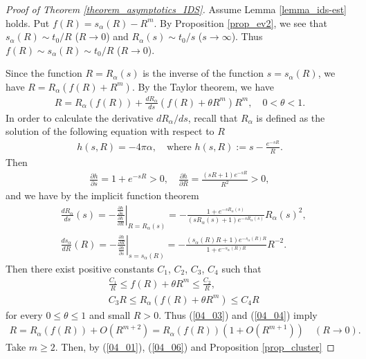 \documentclass[12pt,a4paper]{article}
\begin{document}
\begin{proof}[Proof of Theorem \ref{theorem_asymptotics_IDS}]
Assume Lemma \ref{lemma_ids-est} holds.
Put $f(R)=s_\alpha(R)-R^m$.
By Proposition \ref{prop_ev2},
we see that $s_\alpha(R)\sim t_0/R$ ($R\to 0$) and
$R_\alpha(s)\sim t_0/s$ ($s\to \infty$).
Thus $f(R)\sim s_\alpha(R)\sim t_0/R$ ($R\to 0$).


Since 
the function $R=R_\alpha(s)$ is the inverse of 
the function $s=s_\alpha(R)$, we have
$R=R_\alpha(f(R)+R^m)$.
By the Taylor theorem, we have
\begin{align}
R=
R_\alpha(f(R))+\frac{d R_\alpha}{d s}(f(R)+\theta R^m)R^m,\quad 0<\theta<1.
\label{04_03}
\end{align}
In order to calculate the derivative $dR_\alpha/ds$,
recall that $R_\alpha$ is defined as the solution of the 
following equation with respect to $R$
\begin{align*}
 h(s,R)=-4\pi\alpha,\quad
\mbox{where }
h(s,R):=s- \frac{e^{-sR}}{R}.
\end{align*}
Then
\begin{align*}
 \frac{\partial h}{\partial s}=
1+e^{-sR}>0,\quad
 \frac{\partial h}{\partial R}=
\frac{(sR+1)e^{-sR}}{R^2}>0,
\end{align*}
and we have by the implicit function theorem
\begin{align}
&\frac{dR_\alpha}{ds}(s)
=-
\left.
\frac{\frac{\partial h}{\partial s}}{\frac{\partial h}{\partial R}}
\right|_{R=R_\alpha(s)}
=
-\frac{ 1+e^{-sR_\alpha(s)}}{(sR_\alpha(s)+1)e^{-sR_\alpha(s)}}R_\alpha(s)^2,
\label{04_04}\\
&\frac{ds_\alpha}{dR}(R)
=-
\left.
\frac{\frac{\partial h}{\partial R}}{\frac{\partial h}{\partial s}}
\right|_{s=s_\alpha(R)}
=
-
\frac{(s_\alpha(R)R+1)e^{-s_\alpha(R)R}}{ 1+e^{-s_\alpha(R)R}}R^{-2}.
\label{04_05}
\end{align}
Then there exist positive constants 
$C_1$, $C_2$, $C_3$, $C_4$ such that
\begin{align*}
&\frac{C_1}{R}\leq f(R)+\theta R^m \leq \frac{C_2}{R},\\
&C_3 R\leq R_\alpha(f(R) + \theta R^m)\leq C_4 R
\end{align*}
for every $0\leq \theta \leq 1$ and small $R>0$.
Thus (\ref{04_03}) and (\ref{04_04}) imply
\begin{align}
\label{04_06}
 R = R_\alpha(f(R)) + O(R^{m+2})
=R_\alpha(f(R))(1+O(R^{m+1}))
\quad (R\to 0).
\end{align}
Take $m\geq 2$.
Then, by (\ref{04_01}), (\ref{04_06}) and Proposition \ref{prop_cluster}

\end{proof}
\end{document}
